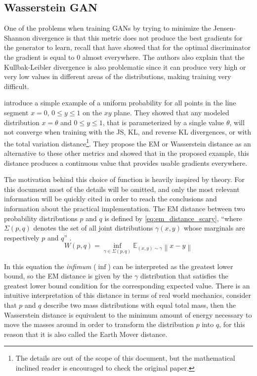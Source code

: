 \subsection{Wasserstein GAN} \label{sub:wgan}
One of the problems when training \acp{GAN} by trying to minimize the Jensen-Shannon divergence is that this metric does not produce the best gradients for the generator to learn, recall that \textcite{principled_gan_methods2017} have showed that for the optimal discriminator the gradient is equal to $0$ almost everywhere. The authors also explain that the Kullbak-Leibler divergence is also problematic since it can produce very high or very low values in different areas of the distributions, making training very difficult.

\textcite{wasserstein2017} introduce a simple example of a uniform probability for all points in the line segment $x=0$, $0 \leq y \leq 1$ on the $xy$ plane. They showed that any modeled distribution $x=\theta$ and $0 \leq y \leq 1$, that is parameterized by a single value $\theta$, will not converge when training with the JS, KL, and reverse KL divergences, or with the total variation distance\footnote{
    The details are out of the scope of this document, but the mathematical inclined reader is encouraged to check the original paper.
}. They propose the \gls{EM} or Wasserstein distance as an alternative to these other metrics and showed that in the proposed example, this distance produces a continuous value that provides usable gradients everywhere.

The motivation behind this choice of function is heavily inspired by theory. For this document most of the details will be omitted, and only the most relevant information will be quickly cited in order to reach the conclusions and information about the practical implementation. The \gls{EM} distance between two probability distributions $p$ and $q$ is defined by \autoref{eq:em_distance_scary}, ``where $\Sigma(p, q)$ denotes the set of all joint distributions $\gamma(x, y)$ whose marginals are respectively $p$ and $q$'' \cite{wasserstein2017}.
\begin{equation} \label{eq:em_distance_scary}
    W(p, q) = \inf_{\gamma \in \Sigma(p, q)} \mathbb{E}_{(x,y)\sim\gamma}\left\| x - y \right\|  
\end{equation}

In this equation the \textit{infimum} ($\inf$) can be interpreted as the greatest lower bound, so the \gls{EM} distance is given by the $\gamma$ distribution that satisfies the greatest lower bound condition for the corresponding expected value. There is an intuitive interpretation of this distance in terms of real world mechanics, consider that $p$ and $q$ describe two mass distributions with equal total mass, then the Wasserstein distance is equivalent to the minimum amount of energy necessary to move the masses around in order to transform the distribution $p$ into $q$, for this reason that it is also called the Earth Mover distance.

